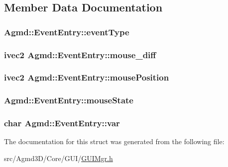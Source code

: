 \subsection{Member Data Documentation}
\hypertarget{struct_agmd_1_1_event_entry_af97b49640672c12ff351ea178cabc71a}{
\subsubsection[{event\+Type}]{ Agmd\+::\+Event\+Entry\+::event\+Type}}\label{struct_agmd_1_1_event_entry_af97b49640672c12ff351ea178cabc71a}
\hypertarget{struct_agmd_1_1_event_entry_ac96a03f6578bee39b9e13c22216f2e0d}{
\subsubsection[{mouse\+\_\+diff}]{\setlength{\rightskip}{0pt plus 5cm}ivec2 Agmd\+::\+Event\+Entry\+::mouse\+\_\+diff}}\label{struct_agmd_1_1_event_entry_ac96a03f6578bee39b9e13c22216f2e0d}
\hypertarget{struct_agmd_1_1_event_entry_a3f4530eee3fca1da2ded38fe6610e4a5}{
\subsubsection[{mouse\+Position}]{\setlength{\rightskip}{0pt plus 5cm}ivec2 Agmd\+::\+Event\+Entry\+::mouse\+Position}}\label{struct_agmd_1_1_event_entry_a3f4530eee3fca1da2ded38fe6610e4a5}
\hypertarget{struct_agmd_1_1_event_entry_af42510fd13aa4e182698be0a50d9a1a0}{
\subsubsection[{mouse\+State}]{ Agmd\+::\+Event\+Entry\+::mouse\+State}}\label{struct_agmd_1_1_event_entry_af42510fd13aa4e182698be0a50d9a1a0}
\hypertarget{struct_agmd_1_1_event_entry_afcc1dcd1bcaba9097f5bdb48b7b188dc}{
\subsubsection[{var}]{\setlength{\rightskip}{0pt plus 5cm}char Agmd\+::\+Event\+Entry\+::var}}\label{struct_agmd_1_1_event_entry_afcc1dcd1bcaba9097f5bdb48b7b188dc}


The documentation for this struct was generated from the following file\+:\begin{DoxyCompactItemize}
\item 
src/\+Agmd3\+D/\+Core/\+G\+U\+I/\hyperlink{_g_u_i_mgr_8h}{G\+U\+I\+Mgr.\+h}\end{DoxyCompactItemize}
